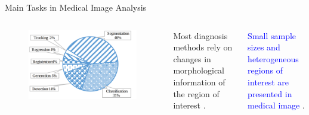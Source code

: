 \documentclass[aspectratio=169]{beamer}
\let\oldcite\cite %
\renewcommand{\cite}[1]{{\tiny\oldcite{#1}}}
\begin{document}
\begin{frame}{ Main Tasks in Medical Image Analysis \cite{li2021systematic}}


\begin{columns}


 \begin{figure}%
    \begin{centering} \includegraphics[width=1\textwidth]{Figures/seg_graph.png}
    \end{centering}
\end{figure}

Most diagnosis methods rely on changes in morphological information of the region of interest \cite{kriti2022characterization}.

\vspace{0.5cm}

\textcolor{blue}{Small sample sizes and heterogeneous regions of interest are presented in medical image} \cite{CASTIGLIONI20219}. 


 \end{columns}
\end{frame}


\end{document}
